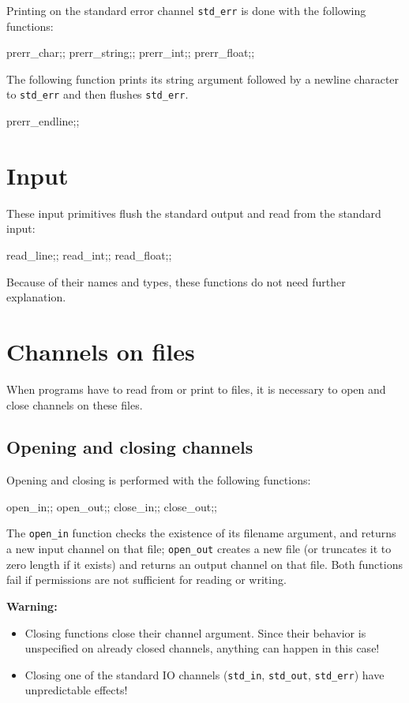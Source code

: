Printing on the standard error channel \verb|std_err| is done with the
following functions:
\begin{caml_example}
prerr_char;;
prerr_string;;
prerr_int;;
prerr_float;;
\end{caml_example}
The following function prints its string argument followed by a
newline character to \verb|std_err| and then flushes \verb|std_err|.
\begin{caml_example}
prerr_endline;;
\end{caml_example}

\section{Input}

These input primitives flush the standard output and read from the
standard input:
\begin{caml_example}
read_line;;
read_int;;
read_float;;
\end{caml_example}
Because of their names and types, these functions do not need further
explanation.

\section{Channels on files}

When programs have to read from or print to files, it is necessary to
open and close channels on these files.

\subsection{Opening and closing channels}

Opening and closing is performed with the following functions:
\begin{caml_example}
open_in;;
open_out;;
close_in;;
close_out;;
\end{caml_example}
The \verb|open_in| function checks the existence of its filename
argument, and returns a new input channel on that file;
\verb|open_out| creates a new file (or truncates it to zero length if
it exists) and returns an output channel on that file. Both functions
fail if permissions are not sufficient for reading or writing.

\noindent
{\bf Warning:}
\begin{itemize}
\item Closing functions close their channel argument. Since
their behavior is unspecified on already closed channels, anything
can happen in this case!
\item Closing one of the standard IO channels (\verb|std_in|,
\verb|std_out|, \verb|std_err|) have unpredictable effects!
\end{itemize}

